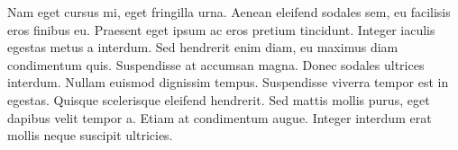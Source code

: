 Nam eget cursus mi, eget fringilla urna. Aenean eleifend sodales sem, eu facilisis eros finibus eu. Praesent eget ipsum ac eros pretium tincidunt. Integer iaculis egestas metus a interdum. Sed hendrerit enim diam, eu maximus diam condimentum quis. Suspendisse at accumsan magna. Donec sodales ultrices interdum. Nullam euismod dignissim tempus. Suspendisse viverra tempor est in egestas. Quisque scelerisque eleifend hendrerit. Sed mattis mollis purus, eget dapibus velit tempor a. Etiam at condimentum augue. Integer interdum erat mollis neque suscipit ultricies.



